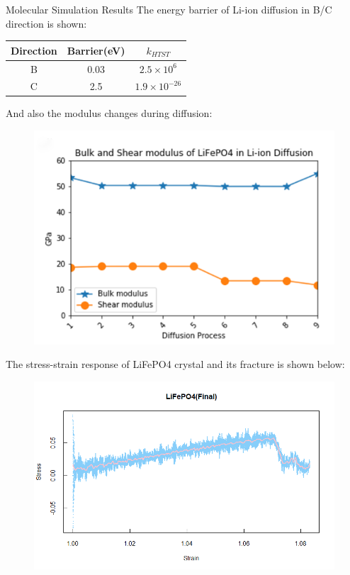 \documentclass[final]{beamer}
\newlength{\onecolwid}
\newlength{\twocolwid}
\begin{document}
\begin{frame}[t]
\begin{columns}[t]
\begin{column}{\twocolwid}
\begin{columns}[t,totalwidth=\twocolwid]
\begin{column}{\onecolwid} %


\begin{block}{Molecular Simulation Results}
The energy barrier of Li-ion diffusion in B/C direction is shown:
\begin{table}
	\centering
    \begin{tabular}{ | c | c | c | }
    \hline
    \hline
    Direction & Barrier(eV) & $k_{HTST}$\\ \hline \hline
    B & 0.03 & $2.5 \times 10^6$\\
    C & 2.5 & $1.9 \times 10^{-26}$ \\
    \hline
    \hline
    \end{tabular}
\end{table}
And also the modulus changes during diffusion:\\
\begin{figure}
\includegraphics[width=0.8\linewidth]{modulus.png}
\end{figure}
The stress-strain response of LiFePO4 crystal and its fracture is shown below:
\begin{figure}
\includegraphics[width=\linewidth]{Final.png}

\end{figure}
\end{block}
\end{column}
\end{columns}
\end{column}
\end{columns}
\end{frame}
\end{document}
